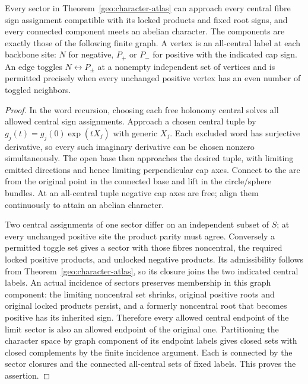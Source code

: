 \begin{theorem}\label{geo:components}
Every sector in Theorem~\ref{geo:character-atlas} can approach every central fibre sign assignment compatible with its locked products and fixed root signs, and every connected component meets an abelian character. The components are exactly those of the following finite graph. A vertex is an all-central label at each backbone site: \(N\) for negative, \(P_+\) or \(P_-\) for positive with the indicated cap sign. An edge toggles \(N\leftrightarrow P_\pm\) at a nonempty independent set of vertices and is permitted precisely when every unchanged positive vertex has an even number of toggled neighbors.
\end{theorem}

\begin{proof}
In the word recursion, choosing each free holonomy central solves all allowed central sign assignments. Approach a chosen central tuple by \(g_j(t)=g_j(0)\exp(tX_j)\) with generic \(X_j\). Each excluded word has surjective derivative, so every such imaginary derivative can be chosen nonzero simultaneously. The open base then approaches the desired tuple, with limiting emitted directions and hence limiting perpendicular cap axes. Connect to the arc from the original point in the connected base and lift in the circle/sphere bundles. At an all-central tuple negative cap axes are free; align them continuously to attain an abelian character.

Two central assignments of one sector differ on an independent subset of \(S\); at every unchanged positive site the product parity must agree. Conversely a permitted toggle set gives a sector with those fibres noncentral, the required locked positive products, and unlocked negative products. Its admissibility follows from Theorem~\ref{geo:character-atlas}, so its closure joins the two indicated central labels. An actual incidence of sectors preserves membership in this graph component: the limiting noncentral set shrinks, original positive roots and original locked products persist, and a formerly noncentral root that becomes positive has its inherited sign. Therefore every allowed central endpoint of the limit sector is also an allowed endpoint of the original one. Partitioning the character space by graph component of its endpoint labels gives closed sets with closed complements by the finite incidence argument. Each is connected by the sector closures and the connected all-central sets of fixed labels. This proves the assertion.
\end{proof}

